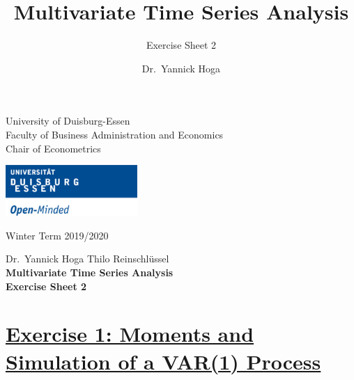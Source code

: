 \documentclass[12pt,a4paper]{article}
\title{Multivariate Time Series Analysis}
\subtitle{Exercise Sheet 2}
\author{Dr.~Yannick Hoga}
\date{}
\newcommand{\tmpsection}[1]{}
\let\tmpsection=\section
\renewcommand{\section}[1]{\tmpsection{\underline{#1}} }
\begin{document}





\restoregeometry



\begin{minipage}{0.6\textwidth}
University of Duisburg-Essen\\
Faculty of Business Administration and Economics\\
Chair of Econometrics\\
\end{minipage}

	\begin{flushright}
	\vspace{-3cm}
	\includegraphics*[width=5cm]{Includes/duelogo_en.png}\\
	\vspace{.5cm}
	\end{flushright}
\vspace{.25cm}
\hspace{-0.005cm}Winter Term 2019/2020

\vspace{0.25cm}

\begin{center}
	\vspace{.25cm}
	Dr.~Yannick Hoga \hspace{.5cm} Thilo Reinschlüssel \\
	\vspace{.25cm}
	\textbf{\Large{Multivariate Time Series Analysis}}\\
	\vspace{.25cm}
	\textbf{\large{Exercise Sheet 2}}\\
	\vspace{.125cm}
\end{center}





\hypertarget{exercise-1-moments-and-simulation-of-a-var1-process}{%
\section{Exercise 1: Moments and Simulation of a VAR(1)
Process}\label{exercise-1-moments-and-simulation-of-a-var1-process}}
\end{document}
